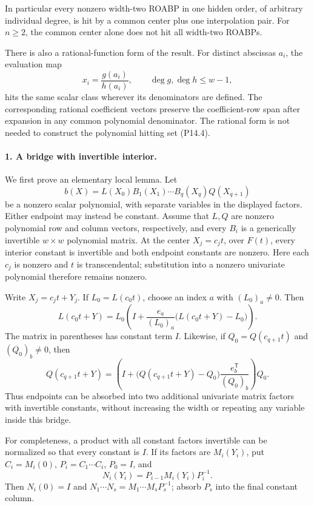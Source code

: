 In particular every nonzero width-two ROABP in one hidden order,
of arbitrary individual degree, is hit by a common center plus
one interpolation pair. For $n\geq2$, the common center alone
does not hit all width-two ROABPs.

There is also a rational-function form of the result. For distinct
abscissas $a_i$, the evaluation map
\[
 x_i=\frac{g(a_i)}{h(a_i)},\qquad
 \deg g,\deg h\leq w-1,
 \tag{P14.5}
\]
hits the same scalar class wherever its denominators are defined.
The corresponding rational coefficient vectors preserve the
coefficient-row span after expansion in any common polynomial
denominator. The rational form is not needed to construct the
polynomial hitting set (P14.4).

\paragraph{1. A bridge with invertible interior.}
We first prove an elementary local lemma. Let
\[
 b(X)=L(X_0)B_1(X_1)\cdots B_q(X_q)Q(X_{q+1})
 \tag{P14.6}
\]
be a nonzero scalar polynomial, with separate variables in the
displayed factors. Either endpoint may instead be constant.
Assume that $L,Q$ are nonzero polynomial row and column vectors,
respectively, and every $B_i$ is a generically invertible
$w\times w$ polynomial matrix. At the center $X_j=c_jt$, over
$F(t)$, every interior constant is invertible and both endpoint
constants are nonzero. Here each $c_j$ is nonzero and $t$ is
transcendental; substitution into a nonzero univariate polynomial
therefore remains nonzero.

Write $X_j=c_jt+Y_j$. If $L_0=L(c_0t)$, choose an index $a$ with
$(L_0)_a\ne0$. Then
\[
 L(c_0t+Y)=L_0\left(I+
       \frac{e_a}{(L_0)_a}\bigl(L(c_0t+Y)-L_0\bigr)\right).
 \tag{P14.7}
\]
The matrix in parentheses has constant term $I$. Likewise, if
$Q_0=Q(c_{q+1}t)$ and $(Q_0)_b\ne0$, then
\[
 Q(c_{q+1}t+Y)=\left(I+
       \bigl(Q(c_{q+1}t+Y)-Q_0\bigr)
                      \frac{e_b^{\mathsf T}}{(Q_0)_b}\right)Q_0.
 \tag{P14.8}
\]
Thus endpoints can be absorbed into two additional univariate
matrix factors with invertible constants, without increasing
the width or repeating any variable inside this bridge.

For completeness, a product with all constant factors invertible
can be normalized so that every constant is $I$. If its factors
are $M_i(Y_i)$, put $C_i=M_i(0)$, $P_i=C_1\cdots C_i$, $P_0=I$,
and
\[
 N_i(Y_i)=P_{i-1}M_i(Y_i)P_i^{-1}.
\]
Then $N_i(0)=I$ and
$N_1\cdots N_s=M_1\cdots M_sP_s^{-1}$; absorb $P_s$ into
the final constant column.

